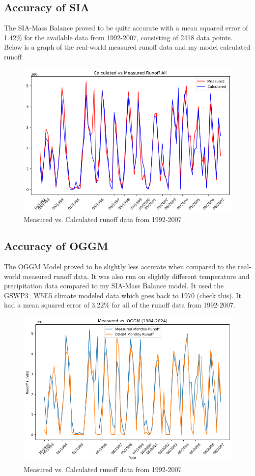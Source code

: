 \documentclass{article}
\begin{document}
\subsection{Accuracy of SIA}
The SIA-Mass Balance proved to be quite accurate with a mean squared error of 1.42\% for the available data from 1992-2007, consisting of 2418 
data points. Below is a graph of the real-world measured runoff data and my model calculated runoff
\begin{figure}[h!]
    \centering
    \includegraphics[width=\textwidth]{Plots/calc_vs_measured.png}
    \caption{Measured vs. Calculated runoff data from 1992-2007}
    \label{fig:calc_vs_measured}
\end{figure}
\FloatBarrier
\subsection{Accuracy of OGGM}
The OGGM Model proved to be slightly less accurate when compared to the real-world measured runoff data. It was also run on slightly different 
temperature and precipitation data compared to my SIA-Mass Balance model. It used the GSWP3\_W5E5 climate modeled data which goes 
back to 1970 (check this). It had a mean squared error of 3.22\% for all of the runoff data from 1992-2007.
\begin{figure}[h!]
    \centering
    \includegraphics[width=\textwidth]{Plots/oggm_vs_measured.png}
    \caption{Measured vs. Calculated runoff data from 1992-2007}
    \label{fig:oggm_vs_measured}
\end{figure}
\FloatBarrier
\end{document}

